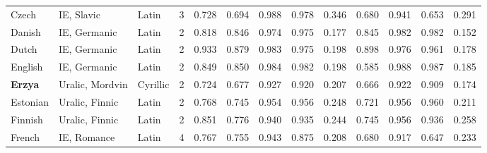 \begin{tabular}{lllrrrrrrrrrr}
                  Czech &                      IE, Slavic &      Latin &         3 &                       0.728 &                         0.694 &         0.988 &                  0.978 &            0.346 &                         0.680 &         0.941 &                  0.653 &            0.291 \\
                 Danish &                    IE, Germanic &      Latin &         2 &                       0.818 &                         0.846 &         0.974 &                  0.975 &            0.177 &                         0.845 &         0.982 &                  0.982 &            0.152 \\
                  Dutch &                    IE, Germanic &      Latin &         2 &                       0.933 &                         0.879 &         0.983 &                  0.975 &            0.198 &                         0.898 &         0.976 &                  0.961 &            0.178 \\
                English &                    IE, Germanic &      Latin &         2 &                       0.849 &                         0.850 &         0.984 &                  0.982 &            0.198 &                         0.585 &         0.988 &                  0.987 &            0.185 \\
         \textbf{Erzya} &                 Uralic, Mordvin &   Cyrillic &         2 &                       0.724 &                         0.677 &         0.927 &                  0.920 &            0.207 &                         0.666 &         0.922 &                  0.909 &            0.174 \\
               Estonian &                  Uralic, Finnic &      Latin &         2 &                       0.768 &                         0.745 &         0.954 &                  0.956 &            0.248 &                         0.721 &         0.956 &                  0.960 &            0.211 \\
                Finnish &                  Uralic, Finnic &      Latin &         2 &                       0.851 &                         0.776 &         0.940 &                  0.935 &            0.244 &                         0.745 &         0.956 &                  0.936 &            0.258 \\
                 French &                     IE, Romance &      Latin &         4 &                       0.767 &                         0.755 &         0.943 &                  0.875 &            0.208 &                         0.680 &         0.917 &                  0.647 &            0.233 \\

\end{tabular}
